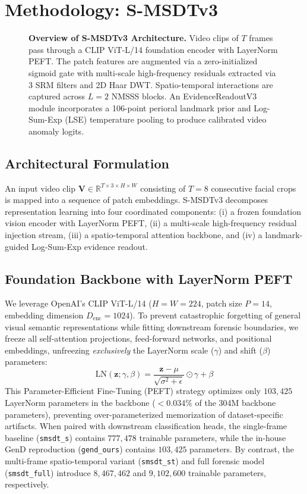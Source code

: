 \section{Methodology: S-MSDTv3}
\label{sec:method}

\begin{figure}[t]
\centering
\fbox{\rule{0pt}{2.2in} \rule{0.95\linewidth}{0pt}}
\caption{\textbf{Overview of S-MSDTv3 Architecture.} Video clips of $T$ frames pass through a CLIP ViT-L/14 foundation encoder with LayerNorm PEFT. The patch features are augmented via a zero-initialized sigmoid gate with multi-scale high-frequency residuals extracted via 3 SRM filters and 2D Haar DWT. Spatio-temporal interactions are captured across $L=2$ NMSSS blocks. An EvidenceReadoutV3 module incorporates a 106-point perioral landmark prior and Log-Sum-Exp (LSE) temperature pooling to produce calibrated video anomaly logits.}
\label{fig:architecture}
\end{figure}

\subsection{Architectural Formulation}
An input video clip $\mathbf{V} \in \mathbb{R}^{T \times 3 \times H \times W}$ consisting of $T=8$ consecutive facial crops is mapped into a sequence of patch embeddings. S-MSDTv3 decomposes representation learning into four coordinated components: (i) a frozen foundation vision encoder with LayerNorm PEFT, (ii) a multi-scale high-frequency residual injection stream, (iii) a spatio-temporal attention backbone, and (iv) a landmark-guided Log-Sum-Exp evidence readout.

\subsection{Foundation Backbone with LayerNorm PEFT}
We leverage OpenAI's CLIP ViT-L/14 \citep{radford2021learning} ($H=W=224$, patch size $P=14$, embedding dimension $D_{\text{enc}}=1024$). To prevent catastrophic forgetting of general visual semantic representations while fitting downstream forensic boundaries, we freeze all self-attention projections, feed-forward networks, and positional embeddings, unfreezing \emph{exclusively} the LayerNorm scale ($\gamma$) and shift ($\beta$) parameters:
\begin{equation}
\text{LN}(\mathbf{z}; \gamma, \beta) = \frac{\mathbf{z} - \mu}{\sqrt{\sigma^2 + \epsilon}} \odot \gamma + \beta
\end{equation}
This Parameter-Efficient Fine-Tuning (PEFT) strategy optimizes only $103{,}425$ LayerNorm parameters in the backbone ($<0.034\%$ of the 304M backbone parameters), preventing over-parameterized memorization of dataset-specific artifacts. When paired with downstream classification heads, the single-frame baseline (\texttt{smsdt\_s}) contains $777{,}478$ trainable parameters, while the in-house GenD reproduction (\texttt{gend\_ours}) contains $103{,}425$ parameters. By contrast, the multi-frame spatio-temporal variant (\texttt{smsdt\_st}) and full forensic model (\texttt{smsdt\_full}) introduce $8{,}467{,}462$ and $9{,}102{,}600$ trainable parameters, respectively.

